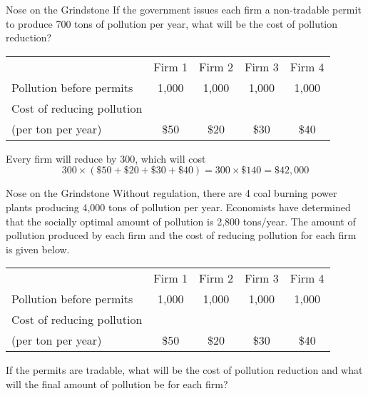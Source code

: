 \documentclass{beamer}
\begin{document}
\begin{frame}{Nose on the Grindstone}
    If the government issues each firm a non-tradable permit to produce 700 tons of pollution per year, what will be the cost of pollution reduction?
    \begin{table}[H]
    \centering
    \begin{tabular}{lcccc}
                                                  & Firm 1 & Firm 2 & Firm 3 & Firm 4 \\
    Pollution before permits                      & 1,000  & 1,000  & 1,000  & 1,000  \\ \hline
    Cost of reducing pollution \\(per ton per year) & \$50   & \$20   & \$30   & \$40  
    \end{tabular}
    \end{table}
    Every firm will reduce by 300, which will cost
    \[300 \times (\$50 + \$20 + \$30 + \$40) = 300 \times \$140 = \boxed{\$42,000}\]
\end{frame}

\begin{frame}{Nose on the Grindstone}
    Without regulation, there are 4 coal burning power plants producing 4,000 tons of pollution per year. Economists have determined that the socially optimal amount of pollution is 2,800 tons/year. The amount of pollution produced by each firm and the cost of reducing pollution for each firm is given below.
    \begin{table}[H]
    \centering
    \begin{tabular}{lcccc}
                                                  & Firm 1 & Firm 2 & Firm 3 & Firm 4 \\
    Pollution before permits                      & 1,000  & 1,000  & 1,000  & 1,000  \\ \hline
    Cost of reducing pollution \\(per ton per year) & \$50   & \$20   & \$30   & \$40  
    \end{tabular}
    \end{table}
    If the permits are tradable, what will be the cost of pollution reduction and what will the final amount of pollution be for each firm?
\end{frame}
\end{document}
